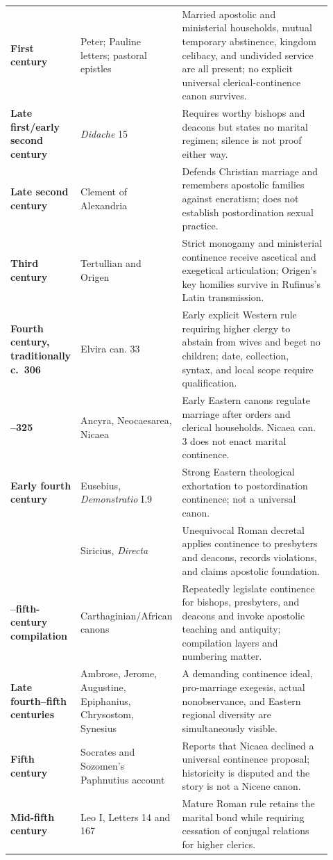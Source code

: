 \begin{longtable}{>{\bfseries\RaggedRight\arraybackslash}p{0.17\linewidth}>{\RaggedRight\arraybackslash}p{0.28\linewidth}>{\RaggedRight\arraybackslash}p{0.47\linewidth}}
First century & Peter; Pauline letters; pastoral epistles & Married apostolic and ministerial households, mutual temporary abstinence, kingdom celibacy, and undivided service are all present; no explicit universal clerical-continence canon survives.\\
Late first/early second century & \emph{Didache} 15 & Requires worthy bishops and deacons but states no marital regimen; silence is not proof either way.\\
Late second century & Clement of Alexandria & Defends Christian marriage and remembers apostolic families against encratism; does not establish postordination sexual practice.\\
Third century & Tertullian and Origen & Strict monogamy and ministerial continence receive ascetical and exegetical articulation; Origen's key homilies survive in Rufinus's Latin transmission.\\
Fourth century, traditionally c.\ 306 & Elvira can. 33 & Early explicit Western rule requiring higher clergy to abstain from wives and beget no children; date, collection, syntax, and local scope require qualification.\\
314--325 & Ancyra, Neocaesarea, Nicaea & Early Eastern canons regulate marriage after orders and clerical households. Nicaea can. 3 does not enact marital continence.\\
Early fourth century & Eusebius, \emph{Demonstratio} I.9 & Strong Eastern theological exhortation to postordination continence; not a universal canon.\\
385 & Siricius, \emph{Directa} & Unequivocal Roman decretal applies continence to presbyters and deacons, records violations, and claims apostolic foundation.\\
390--fifth-century compilation & Carthaginian/African canons & Repeatedly legislate continence for bishops, presbyters, and deacons and invoke apostolic teaching and antiquity; compilation layers and numbering matter.\\
Late fourth--fifth centuries & Ambrose, Jerome, Augustine, Epiphanius, Chrysostom, Synesius & A demanding continence ideal, pro-marriage exegesis, actual nonobservance, and Eastern regional diversity are simultaneously visible.\\
Fifth century & Socrates and Sozomen's Paphnutius account & Reports that Nicaea declined a universal continence proposal; historicity is disputed and the story is not a Nicene canon.\\
Mid-fifth century & Leo I, Letters 14 and 167 & Mature Roman rule retains the marital bond while requiring cessation of conjugal relations for higher clerics.\\

\end{longtable}
